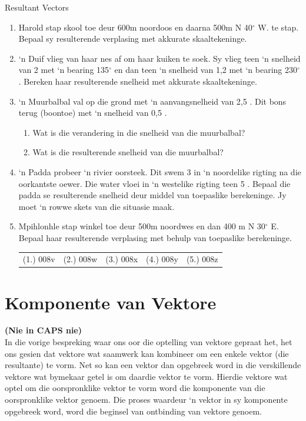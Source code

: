 \begin{exercises}{Resultant Vectors}{ \noindent\vspace{-1cm}
\begin{enumerate}[noitemsep, label=\textbf{\arabic*}.]
\item Harold stap skool toe deur 600m noordoos en daarna 500m N 40$^\circ$ W. te stap. Bepaal sy resulterende verplasing met akkurate skaaltekeninge.
\item ‘n Duif vlieg van haar nes af om haar kuiken te soek. Sy vlieg teen ‘n snelheid van 2 \ms met ‘n bearing 135$^\circ$ en dan teen ‘n snelheid van 1,2 \ms met ‘n bearing 230$^\circ$. Bereken haar resulterende snelheid met akkurate skaaltekeninge.
\item ‘n Muurbalbal val op die grond met ‘n aanvangsnelheid van 2,5 \ms. Dit bons terug (boontoe) met ‘n snelheid van 0,5 \ms. \begin{enumerate}
	\item Wat is die verandering in die snelheid van die muurbalbal?
	\item Wat is die resulterende snelheid van die muurbalbal?
	\end{enumerate}
\item ‘n Padda probeer ‘n rivier oorsteek. Dit swem 3 \ms in ‘n noordelike rigting na die oorkantste oewer. Die water vloei in ‘n westelike rigting teen 5 \ms. Bepaal die padda se resulterende snelheid deur middel van toepaslike berekeninge. Jy moet ‘n rowwe skets van die situasie maak.
\item Mpihlonhle stap winkel toe deur 500m noordwes en dan 400 m N 30$^\circ$ E. Bepaal haar resulterende verplasing met behulp van toepaslike berekeninge.
  \label{59e414b70efc194a27a122db47d06ce6**end}
\par \practiceinfo
 \par \begin{tabular}[h]{ccccc}
 (1.) 008v  &  (2.) 008w  &  (3.) 008x &  (4.) 008y  &  (5.) 008z\end{tabular}
\end{enumerate}
}
\end{exercises}



\section{Komponente van Vektore}
\textbf{(Nie in CAPS nie)}\\
In die vorige bespreking waar ons oor die optelling van vektore gepraat het, het ons gesien dat vektore wat saamwerk kan kombineer om een enkele vektor (die resultante) te vorm. Net so kan een vektor dan opgebreek word in die verskillende vektore wat bymekaar getel is om daardie vektor te vorm. Hierdie vektore wat optel om die oorspronklike vektor te vorm word die komponente van die oorspronklike vektor genoem. Die proses waardeur ‘n vektor in sy komponente opgebreek word, word die beginsel van ontbinding van vektore genoem.

